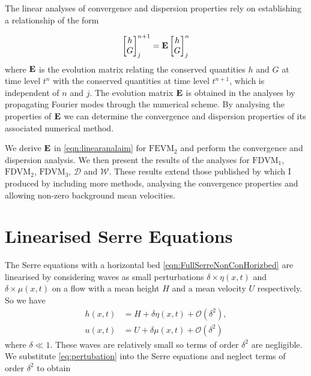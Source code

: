 The linear analyses of convergence and dispersion properties rely on establishing a relationship of the form

\begin{equation}
\label{eqn:linearanalaim}
\begin{bmatrix}
h \\G 
\end{bmatrix}^{n+1}_j = \mathbf{E} \begin{bmatrix}
h \\G 
\end{bmatrix}^{n}_j
\end{equation}
 where $\mathbf{E}$ is the evolution matrix relating the conserved quantities $h$ and $G$ at time level $t^n$ with the conserved quantities at time level $t^{n+1}$, which is independent of $n$ and $j$. The evolution matrix $\mathbf{E}$ is obtained in the analyses by propagating Fourier modes through the numerical scheme. By analysing the properties of $\mathbf{E}$ we can determine the convergence and dispersion properties of its associated numerical method.
 
 We derive $\mathbf{E}$ in \eqref{eqn:linearanalaim} for $\text{FEVM}_2$ and perform the convergence and dispersion analysis. We then present the results of the analyses for $\text{FDVM}_1$, $\text{FDVM}_2$, $\text{FDVM}_3$, $\mathcal{D}$ and $\mathcal{W}$. These results extend those published by \cite{Zoppou-etal-2017} which I produced by including more methods, analysing the convergence properties and allowing non-zero background mean velocities.
 
\section{Linearised Serre Equations}
The Serre equations with a horizontal bed \eqref{eqn:FullSerreNonConHorizbed} are linearised by considering waves as small perturbations $\delta\times\eta(x,t)$ and $\delta \times\mu(x,t)$ on a flow with a mean height $H$ and a mean velocity $U$ respectively. So we have
\begin{subequations}
	\label{eq:pertubation}
\begin{align}
h(x,t) &= H + \delta \eta(x,t) + \mathcal{O}\left(\delta^2 \right), \\
u(x,t) &= U + \delta \mu(x,t) + \mathcal{O}\left(\delta^2 \right)
\end{align}
\end{subequations}
where $\delta \ll 1$. These waves are relatively small so terms of order $\delta^2$ are negligible. We substitute \eqref{eq:pertubation} into the Serre equations and neglect terms of order $\delta^2$ to obtain

